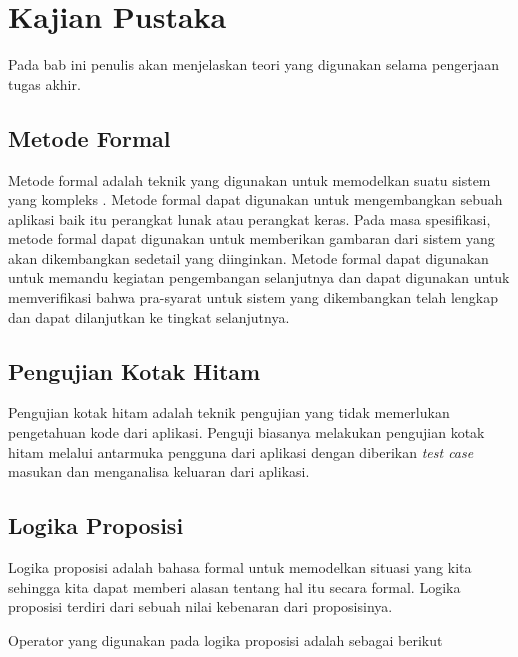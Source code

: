 \chapter{Kajian Pustaka}

Pada bab ini penulis akan menjelaskan teori yang digunakan selama pengerjaan tugas akhir.

\section{Metode Formal}

Metode formal adalah teknik yang digunakan untuk memodelkan suatu
sistem yang kompleks \cite{huth2004logic}. Metode formal dapat digunakan untuk mengembangkan
sebuah aplikasi baik itu perangkat lunak atau perangkat keras. Pada
masa spesifikasi, metode formal dapat digunakan untuk memberikan gambaran
dari sistem yang akan dikembangkan sedetail yang diinginkan. Metode
formal dapat digunakan untuk memandu kegiatan pengembangan selanjutnya
dan dapat digunakan untuk memverifikasi bahwa pra-syarat untuk sistem yang
dikembangkan telah lengkap dan dapat dilanjutkan ke tingkat selanjutnya.

\section{Pengujian Kotak Hitam}

Pengujian kotak hitam adalah teknik pengujian yang tidak memerlukan pengetahuan kode dari aplikasi. Penguji biasanya melakukan pengujian kotak hitam melalui antarmuka pengguna dari aplikasi dengan diberikan \textit{test case} masukan dan menganalisa keluaran dari aplikasi.

\section{Logika Proposisi}

Logika proposisi adalah bahasa formal untuk memodelkan situasi yang kita sehingga kita dapat memberi alasan tentang hal itu secara formal. Logika proposisi terdiri dari sebuah nilai kebenaran dari proposisinya.

Operator yang digunakan pada logika proposisi adalah sebagai berikut

